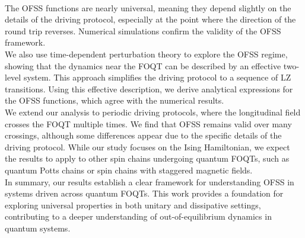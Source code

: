 {\\$ $\\
The OFSS functions are nearly universal, meaning they depend slightly on the details of the driving protocol, especially at the point where the direction of the round trip reverses. Numerical simulations confirm the validity of the OFSS framework.
\\$ $\\
We also use time-dependent perturbation theory to explore the OFSS regime, showing that the dynamics near the FOQT can be described by an effective two-level system. This approach simplifies the driving protocol to a sequence of LZ transitions. Using this effective description, we derive analytical expressions for the OFSS functions, which agree with the numerical results.
\\$ $\\
We extend our analysis to periodic driving protocols, where the longitudinal field crosses the FOQT multiple times. We find that OFSS remains valid over many crossings, although some differences appear due to the specific details of the driving protocol. While our study focuses on the Ising Hamiltonian, we expect the results to apply to other spin chains undergoing quantum FOQTs, such as quantum Potts chains or spin chains with staggered magnetic fields.
\\$ $\\
In summary, our results establish a clear framework for understanding OFSS in systems driven across quantum FOQTs. This work provides a foundation for exploring universal properties in both unitary and dissipative settings, contributing to a deeper understanding of out-of-equilibrium dynamics in quantum systems.
}